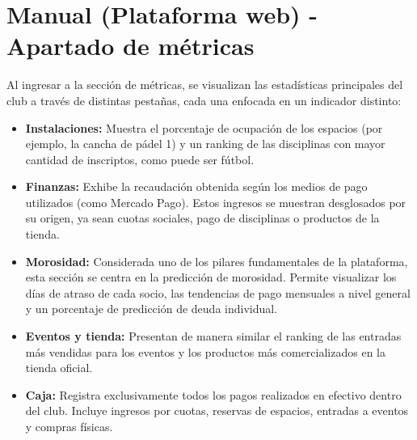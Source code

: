 \section{Manual (Plataforma web) - Apartado de métricas}

Al ingresar a la sección de métricas, se visualizan las estadísticas principales del club a través de distintas pestañas, cada una enfocada en un indicador distinto:

\begin{itemize}
    \item \textbf{Instalaciones:} Muestra el porcentaje de ocupación de los espacios (por ejemplo, la cancha de pádel 1) y un ranking de las disciplinas con mayor cantidad de inscriptos, como puede ser fútbol.
    \item \textbf{Finanzas:} Exhibe la recaudación obtenida según los medios de pago utilizados (como Mercado Pago). Estos ingresos se muestran desglosados por su origen, ya sean cuotas sociales, pago de disciplinas o productos de la tienda.
    \item \textbf{Morosidad:} Considerada uno de los pilares fundamentales de la plataforma, esta sección se centra en la predicción de morosidad. Permite visualizar los días de atraso de cada socio, las tendencias de pago mensuales a nivel general y un porcentaje de predicción de deuda individual.
    \item \textbf{Eventos y tienda:} Presentan de manera similar el ranking de las entradas más vendidas para los eventos y los productos más comercializados en la tienda oficial.
    \item \textbf{Caja:} Registra exclusivamente todos los pagos realizados en efectivo dentro del club. Incluye ingresos por cuotas, reservas de espacios, entradas a eventos y compras físicas.
\end{itemize}

